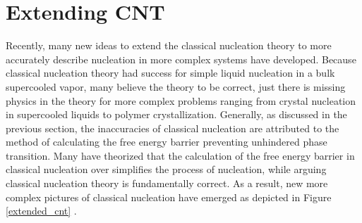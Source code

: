 \section{Extending CNT}
Recently, many new ideas to extend the classical nucleation theory to more accurately describe nucleation in more complex systems have developed.  Because classical nucleation theory had success for simple liquid nucleation in a bulk supercooled vapor, many believe the theory to be correct, just there is missing physics in the theory for more complex problems ranging from crystal nucleation in supercooled liquids to polymer crystallization.  Generally, as discussed in the previous section, the inaccuracies of classical nucleation are attributed to the method of calculating the free energy barrier preventing unhindered phase transition.  Many have theorized that the calculation of the free energy barrier in classical nucleation over simplifies the process of nucleation, while arguing classical nucleation theory is fundamentally correct.  As a result, new more complex pictures of classical nucleation have emerged as depicted in Figure \ref{extended_cnt} \cite{DeYoreo2016}.

